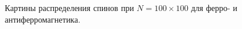 \documentclass[12pt,a4paper]{article}
\begin{document}
\begin{figure}[!htb]
            \hspace{8pt}%
            \hspace{8pt}%
            \hspace{8pt}%
            \caption[]{Картины распределения спинов при $N=100\times 100$ для ферро- и антиферромагнетика.}%
            \label{fig:3}%
        \end{figure}
\end{document}

